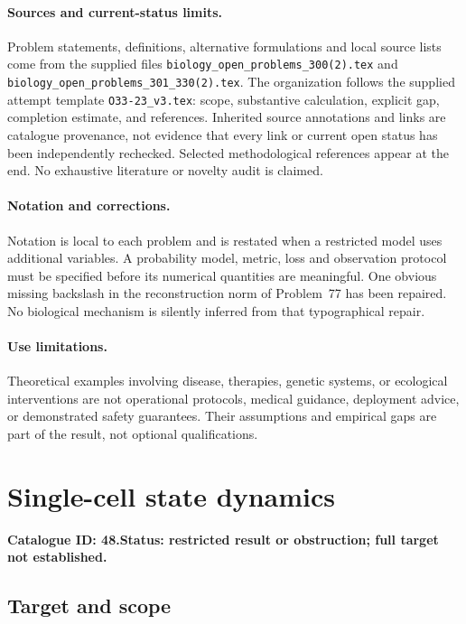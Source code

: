 \documentclass[11pt]{article}
\begin{document}
\paragraph{Sources and current-status limits.}
Problem statements, definitions, alternative formulations and local source lists
come from the supplied files
\texttt{biology\_open\_problems\_300(2).tex} and
\texttt{biology\_open\_problems\_301\_330(2).tex}.
The organization follows the supplied attempt template
\texttt{O33-23\_v3.tex}: scope, substantive calculation, explicit gap,
completion estimate, and references. Inherited source annotations and links are
catalogue provenance, not evidence that every link or current open status has
been independently rechecked. Selected methodological references appear at the
end. No exhaustive literature or novelty audit is claimed.

\paragraph{Notation and corrections.}
Notation is local to each problem and is restated when a restricted model uses
additional variables. A probability model, metric, loss and observation protocol
must be specified before its numerical quantities are meaningful. One obvious
missing backslash in the reconstruction norm of Problem~77 has been repaired.
No biological mechanism is silently inferred from that typographical repair.

\paragraph{Use limitations.}
Theoretical examples involving disease, therapies, genetic systems, or ecological
interventions are not operational protocols, medical guidance, deployment advice,
or demonstrated safety guarantees. Their assumptions and empirical gaps are part
of the result, not optional qualifications.

\setcounter{section}{47}
\section{Single-cell state dynamics}
\label{prob:048}
\noindent\textbf{Catalogue ID: 48.}\quad \textbf{Status: restricted result or obstruction; full target not established.}
\subsection{Target and scope}
\end{document}
